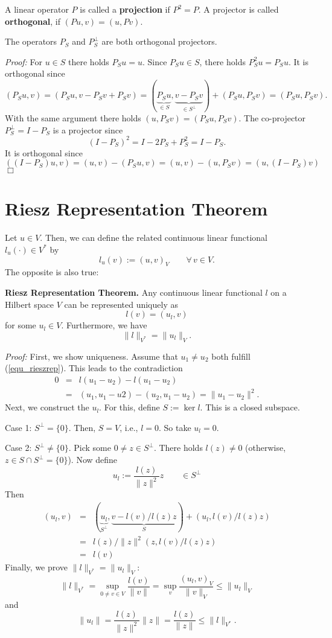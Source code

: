 \begin{definition} A linear operator $P$ is called a {\bf projection} if $P^2 = P$.
A projector is called {\bf orthogonal}, if $(Pu,v) = (u,Pv)$.
\end{definition}
\begin{lemma} The operators $P_S$ and $P_S^\bot$ are both orthogonal 
projectors.
\end{lemma}
\noindent
{\em Proof:} For $u \in S$ there holds $P_S u = u$. Since $P_S u \in S$, there holds $P_S^2 u = P_S u$. It is orthogonal since
$$
(P_Su,v) = (P_Su,v-P_Sv+P_Sv) = (\underbrace{P_S u}_{\in S}, \underbrace{v-P_Sv}_{\in S^\bot}) + (P_Su,P_Sv) = (P_Su,P_Sv).
$$
With the same argument there holds $(u,P_Sv) = (P_Su,P_Sv)$.
The co-projector $P_S^\bot = I - P_S$ is a projector since
$$
(I-P_S)^2 = I - 2 P_S + P_S^2 = I - P_S.
$$
It is orthogonal since $((I-P_S) u,v) = (u,v)-(P_Su,v) =
        (u,v)-(u,P_Sv) = (u,(I-P_S)v)$
\hfill $\Box$

\section{Riesz Representation Theorem}
Let $u \in V$. Then, we can define the related continuous linear
functional~$l_u(\cdot) \in V^\ast$ by
$$
l_u (v) := (u,v)_V \qquad \forall \, v \in V.
$$
The opposite is also true:
\begin{theorem} {\bf Riesz Representation Theorem.} Any continuous linear
functional $l$ on a Hilbert space $V$ can be represented uniquely as
\begin{equation}
\label{equ_rieszrep}
l(v) = (u_l,v)
\end{equation}
for some $u_l \in V$. Furthermore, we have
$$
\| l \|_{V^\ast} = \| u_l \|_V.
$$
\end{theorem}
\noindent
{\em Proof:} First, we show uniqueness. Assume that $u_1 \neq u_2$ both
fulfill (\ref{equ_rieszrep}). This leads to the contradiction
\begin{eqnarray*}
0 & = & l(u_1-u_2) - l(u_1-u_2) \\
  & = & (u_1,u_1-u2) - (u_2,u_1-u_2) = \| u_1 - u_2 \|^2.
\end{eqnarray*}
Next, we construct the $u_l$. For this, define 
$S := \operatorname{ker} l$. This is a closed subspace. 

\noindent
Case 1: $S^\bot = \{ 0 \}$. Then, $S = V$, i.e., $l = 0$. So take $u_l = 0$.

\noindent
Case 2: $S^\bot \neq \{ 0 \}$. Pick some $0 \neq z \in S^\bot$. There
holds $l(z) \neq 0$ (otherwise, $z \in S \cap S^\bot = \{ 0 \}$).
Now define 
$$
u_l := \frac{l(z)}{\|z\|^2} z \qquad \in S^\bot
$$
Then
\begin{eqnarray*}
(u_l,v) & = & (\underbrace{u_l}_{S^\bot}, \underbrace{v - l(v)/l(z) z}_S) + (u_l,l(v)/l(z)z) \\
& = & l(z) / \| z\|^2 (z,l(v)/l(z) z) \\
& = & l(v)
\end{eqnarray*}
Finally, we prove $\|l\|_{V^\ast} = \| u_l \|_V$:
$$
\|l\|_{V^\ast} = \sup_{0 \neq v \in V} \frac{l(v)}{\|v\|}
        = \sup_v \frac{(u_l,v)_V}{\|v\|_V} \leq \| u_l \|_V
$$
and
$$
\| u_l \| = \frac{l(z)}{\|z\|^2}  \|z\| = \frac{l(z)}{\|z\|} \leq \| l \|_{V^\ast}.
$$


